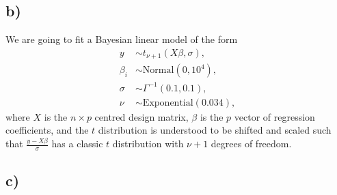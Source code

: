 \documentclass[10pt]{extarticle}
\begin{document}
\subsection*{b)}

We are going to fit a Bayesian linear model of the form 
\begin{align*}
y &\sim t_{\nu+1}(X\beta, \sigma),\\
\beta_i & \sim \mathrm{Normal}(0, 10^4),\\
\sigma &\sim \Gamma^{-1}(0.1, 0.1),\\
\nu &\sim \mathrm{Exponential}(0.034),
\end{align*}
where $X$ is the $n \times p$ centred design matrix, $\beta$ is the $p$ vector of regression coefficients, and the $t$ distribution is understood to be shifted and scaled such that $\frac{y-X\beta}{\sigma}$ has a classic $t$ distribution with $\nu + 1$ degrees of freedom.

\subsection*{c)}
\end{document}
